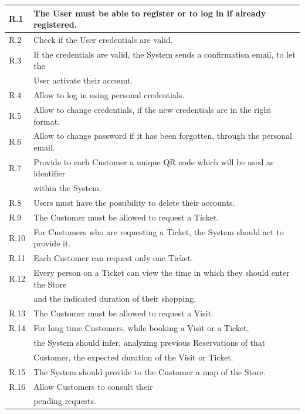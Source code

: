 \documentclass[a4paper, 12pt, oneside, table]{article}
\begin{document}
\begin{tabularx}{\linewidth}{| o || l |}
    \hline
    R.1 & The User must be able to register or to log in if already registered.\\
    \hline
    R.2 & Check if the User credentials are valid.\\
    \hline
    R.3 & If the credentials are valid, the System sends a confirmation email, to let the\\
    & User activate their account.\\
    \hline
    R.4 & Allow to log in using personal credentials. \\
    \hline
    R.5 & Allow to change credentials, if the new credentials are in the right format. \\
    \hline
    R.6 & Allow to change password if it has been forgotten, through the personal email. \\
    \hline
    R.7 & Provide to each Customer a unique QR code which will be used as identifier\\
    & within the System.\\
    \hline
    R.8 & Users must have the possibility to delete their accounts. \\
    \hline
    R.9 & The Customer must be allowed to request a Ticket. \\
    \hline
    R.10 & For Customers who are requesting a Ticket, the System should act to provide it. \\
    \hline
    R.11 & Each Customer can request only one Ticket. \\
    \hline
    R.12 & Every person on a Ticket can view the time in which they should enter the Store\\
    & and the indicated duration of their shopping. \\
    \hline
    R.13 & The Customer must be allowed to request a Visit.\\
    \hline
    R.14 & For long time Customers, while booking a Visit or a Ticket,\\
    & the System should infer, analyzing previous Reservations of that\\ 
    & Customer, the expected duration of the Visit or Ticket. \\
    \hline
    R.15 & The System should provide to the Customer a map of the Store.\\
    \hline
    R.16 & Allow Customers to consult their\\
    & pending requests.\\

\end{tabularx}
\end{document}
